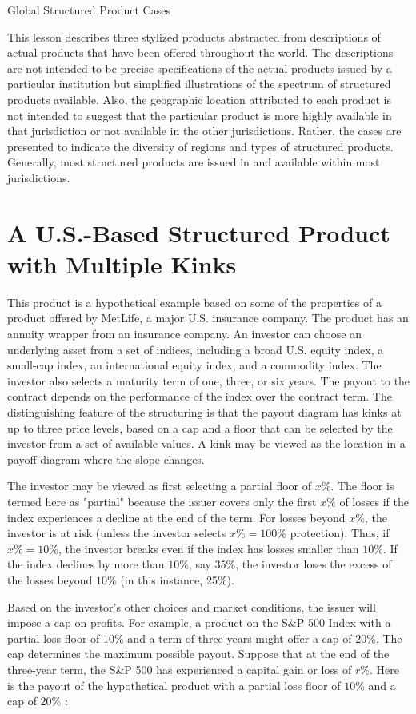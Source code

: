 \documentclass[11pt]{article}
\begin{document}
Global Structured Product Cases

This lesson describes three stylized products abstracted from descriptions of actual products that have been offered throughout the world. The descriptions are not intended to be precise specifications of the actual products issued by a particular institution but simplified illustrations of the spectrum of structured products available. Also, the geographic location attributed to each product is not intended to suggest that the particular product is more highly available in that jurisdiction or not available in the other jurisdictions. Rather, the cases are presented to indicate the diversity of regions and types of structured products. Generally, most structured products are issued in and available within most jurisdictions.

\section*{A U.S.-Based Structured Product with Multiple Kinks}
This product is a hypothetical example based on some of the properties of a product offered by MetLife, a major U.S. insurance company. The product has an annuity wrapper from an insurance company. An investor can choose an underlying asset from a set of indices, including a broad U.S. equity index, a small-cap index, an international equity index, and a commodity index. The investor also selects a maturity term of one, three, or six years. The payout to the contract depends on the performance of the index over the contract term. The distinguishing feature of the structuring is that the payout diagram has kinks at up to three price levels, based on a cap and a floor that can be selected by the investor from a set of available values. A kink may be viewed as the location in a payoff diagram where the slope changes.

The investor may be viewed as first selecting a partial floor of $x \%$. The floor is termed here as "partial" because the issuer covers only the first $x \%$ of losses if the index experiences a decline at the end of the term. For losses beyond $x \%$, the investor is at risk (unless the investor selects $x \%=100 \%$ protection). Thus, if $x \%=10 \%$, the investor breaks even if the index has losses smaller than $10 \%$. If the index declines by more than $10 \%$, say $35 \%$, the investor loses the excess of the losses beyond $10 \%$ (in this instance, 25\%).

Based on the investor's other choices and market conditions, the issuer will impose a cap on profits. For example, a product on the S\&P 500 Index with a partial loss floor of $10 \%$ and a term of three years might offer a cap of $20 \%$. The cap determines the maximum possible payout. Suppose that at the end of the three-year term, the S\&P 500 has experienced a capital gain or loss of $r \%$. Here is the payout of the hypothetical product with a partial loss floor of $10 \%$ and a cap of $20 \%$ :
\end{document}
